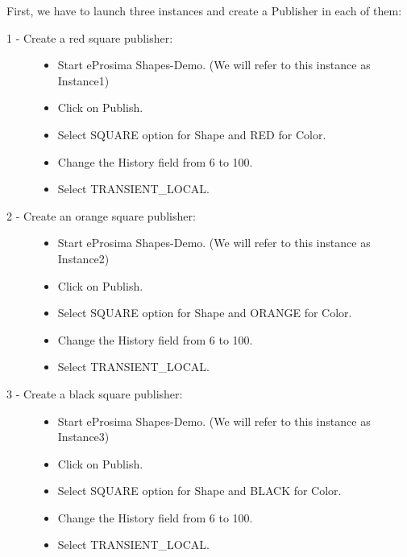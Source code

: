\documentclass[letterpaper,10pt,english]{sphinxmanual}
\begin{document}
First, we have to launch three instances and create a Publisher in each of them:
\begin{description}
\item[{1 - Create a red square publisher:}] \leavevmode\begin{itemize}
\item {} 
Start eProsima Shapes-Demo. (We will refer to this instance as Instance1)

\item {} 
Click on Publish.

\item {} 
Select SQUARE option for Shape and RED for Color.

\item {} 
Change the History field from 6 to 100.

\item {} 
Select TRANSIENT\_LOCAL.

\end{itemize}

\item[{2 - Create an orange square publisher:}] \leavevmode\begin{itemize}
\item {} 
Start eProsima Shapes-Demo. (We will refer to this instance as Instance2)

\item {} 
Click on Publish.

\item {} 
Select SQUARE option for Shape and ORANGE for Color.

\item {} 
Change the History field from 6 to 100.

\item {} 
Select TRANSIENT\_LOCAL.

\end{itemize}

\item[{3 - Create a black square publisher:}] \leavevmode\begin{itemize}
\item {} 
Start eProsima Shapes-Demo. (We will refer to this instance as Instance3)

\item {} 
Click on Publish.

\item {} 
Select SQUARE option for Shape and BLACK for Color.

\item {} 
Change the History field from 6 to 100.

\item {} 
Select TRANSIENT\_LOCAL.

\end{itemize}

\end{description}
\end{document}

